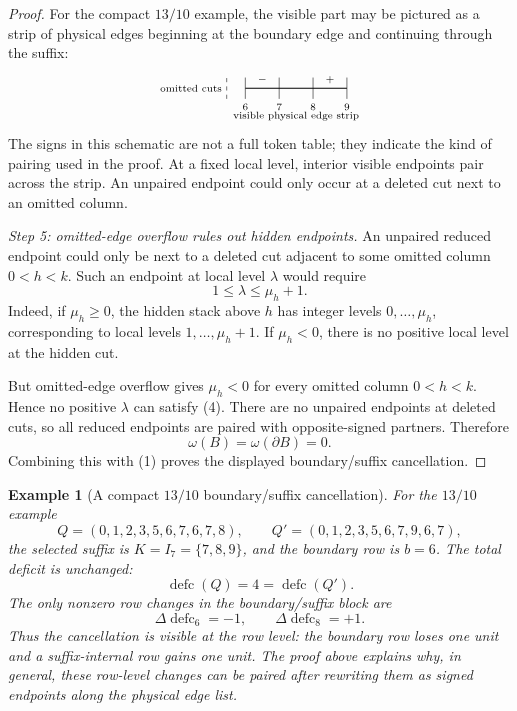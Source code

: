 \documentclass[10pt]{article}
\newtheorem{example}{Example}
\newcommand{\defc}{\operatorname{defc}}
\begin{document}
\begin{proof}
For the compact \(13/10\) example, the visible part may be pictured as a strip
of physical edges beginning at the boundary edge and continuing through the
suffix:
\[
\begin{tikzpicture}[x=.85cm,y=.45cm,baseline=(current bounding box.center)]
  \foreach \x/\lab in {0/{6},1/{7},2/{8},3/{9}} {
    \draw (\x,0) -- (\x,1.2);
    \node[below] at (\x,0) {\scriptsize \(\lab\)};
  }
  \draw[thick] (0,.6) -- (3,.6);
  \node[above] at (0.5,.6) {\scriptsize \(-\)};
  \node[above] at (2.5,.6) {\scriptsize \(+\)};
  \node[below] at (1.5,-.45) {\scriptsize visible physical edge strip};
  \draw[dashed] (-.55,0) -- (-.55,1.2);
  \node[left] at (-.55,.6) {\scriptsize omitted cuts};
\end{tikzpicture}
\]
The signs in this schematic are not a full token table; they indicate the
kind of pairing used in the proof.  At a fixed local level, interior visible
endpoints pair across the strip.  An unpaired endpoint could only occur at a
deleted cut next to an omitted column.

\smallskip
\noindent\emph{Step 5: omitted-edge overflow rules out hidden endpoints.}
An unpaired reduced endpoint could only be next to a deleted cut adjacent to
some omitted column \(0<h<k\).  Such an endpoint at local level \(\lambda\)
would require
\[
  1\le \lambda\le \mu_h+1.
  \tag{4}
\]
Indeed, if \(\mu_h\ge0\), the hidden stack above \(h\) has integer levels
\(0,\ldots,\mu_h\), corresponding to local levels
\(1,\ldots,\mu_h+1\).  If \(\mu_h<0\), there is no positive local level at the
hidden cut.

But omitted-edge overflow gives \(\mu_h<0\) for every omitted column
\(0<h<k\).  Hence no positive \(\lambda\) can satisfy (4).  There are no
unpaired endpoints at deleted cuts, so all reduced endpoints are paired with
opposite-signed partners.  Therefore
\[
  \omega(B)=\omega(\partial B)=0.
\]
Combining this with (1) proves the displayed boundary/suffix cancellation.
\end{proof}

\begin{example}[A compact \(13/10\) boundary/suffix cancellation]
For the \(13/10\) example
\[
  Q=(0,1,2,3,5,6,7,6,7,8),\qquad
  Q'=(0,1,2,3,5,6,7,9,6,7),
\]
the selected suffix is \(K=I_7=\{7,8,9\}\), and the boundary row is
\(b=6\).  The total deficit is unchanged:
\[
  \defc(Q)=4=\defc(Q').
\]
The only nonzero row changes in the boundary/suffix block are
\[
  \Delta\defc_6=-1,\qquad \Delta\defc_8=+1.
\]
Thus the cancellation is visible at the row level: the boundary row loses one
unit and a suffix-internal row gains one unit.  The proof above explains why,
in general, these row-level changes can be paired after rewriting them as
signed endpoints along the physical edge list.
\end{example}
\end{document}
